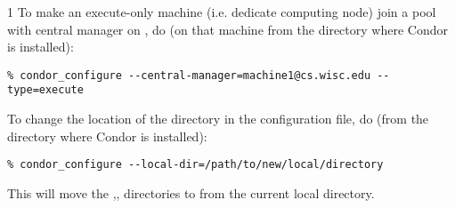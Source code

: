 \begin{ManPage}{\label{man-condor-configure}}{1}
To make an execute-only machine (i.e. dedicate computing node) join a pool with central manager on , do (on that machine from the directory where Condor is installed):
\begin{verbatim}
% condor_configure --central-manager=machine1@cs.wisc.edu --type=execute
\end{verbatim}



To change the location of the  directory
in the configuration file, do (from the directory where Condor is installed):
\begin{verbatim}
% condor_configure --local-dir=/path/to/new/local/directory
\end{verbatim}
This will move the ,, directories to  from the current local directory.



\end{ManPage}
